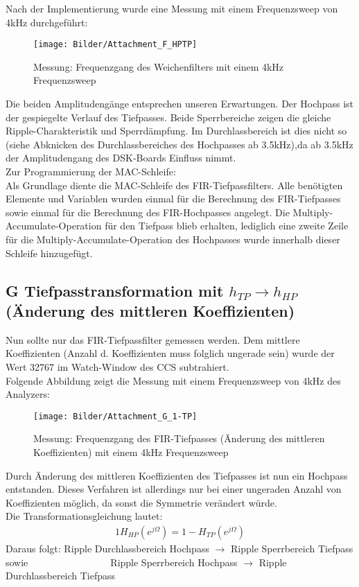 \noindent Nach der Implementierung wurde eine Messung mit einem Frequenzsweep von 4kHz durchgeführt:

\begin{figure}[h]
	\centering
	\texttt{[image: Bilder/Attachment\_F\_HPTP]}
	\caption{Messung: Frequenzgang des Weichenfilters mit einem 4kHz Frequenzsweep}
	\label{fig:Attachment_F_HPTP}
\end{figure}

\noindent Die beiden Amplitudengänge entsprechen unseren Erwartungen. Der Hochpass ist der gespiegelte Verlauf des Tiefpasses. Beide Sperrbereiche zeigen die gleiche Ripple-Charakteristik und Sperrdämpfung.
Im Durchlassbereich ist dies nicht so (siehe Abknicken des Durchlassbereiches des Hochpasses ab 3.5kHz),da ab 3.5kHz der Amplitudengang des DSK-Boards Einfluss nimmt. \\
\noindent Zur Programmierung der MAC-Schleife: \\
\noindent Als Grundlage diente die MAC-Schleife des FIR-Tiefpassfilters. Alle benötigten Elemente und Variablen wurden einmal für die Berechnung des FIR-Tiefpasses sowie einmal für die Berechnung des FIR-Hochpasses angelegt. Die Multiply-Accumulate-Operation für den Tiefpass blieb erhalten, lediglich eine zweite Zeile für die Multiply-Accumulate-Operation des Hochpasses wurde innerhalb dieser Schleife hinzugefügt.

\clearpage

\subsection{G Tiefpasstransformation mit $h_{TP} \rightarrow h_{HP}$ (Änderung des mittleren Koeffizienten)}
\noindent Nun sollte nur das FIR-Tiefpassfilter gemessen werden. Dem mittlere Koeffizienten (Anzahl d. Koeffizienten muss folglich ungerade sein) wurde der Wert 32767 im Watch-Window des CCS subtrahiert.\\
Folgende Abbildung zeigt die Messung mit einem Frequenzsweep von 4kHz des Analyzers:\\

\begin{figure}[h]
	\centering
	\texttt{[image: Bilder/Attachment\_G\_1-TP]}
	\caption{Messung: Frequenzgang des FIR-Tiefpasses (Änderung des mittleren Koeffizienten) mit einem 4kHz Frequenzsweep}
	\label{fig:Attachment_G_1-TP}
\end{figure}

\noindent Durch Änderung des mittleren Koeffizienten des Tiefpasses ist nun ein Hochpass entstanden.
Dieses Verfahren ist allerdings nur bei einer ungeraden Anzahl von Koeffizienten möglich, da sonst die Symmetrie verändert würde.\\
\noindent Die Transformationsgleichung lautet:
\begin{alignat}{1}
H_{HP}(e^{j\Omega}) = 1-H_{TP}(e^{j\Omega})
\end{alignat}
\noindent Daraus folgt: Ripple Durchlassbereich Hochpass $\rightarrow$ Ripple Sperrbereich Tiefpass \\
sowie~~~~~~~~~~~~~~~~~Ripple Sperrbereich Hochpass $\rightarrow$ Ripple Durchlassbereich Tiefpass

 
